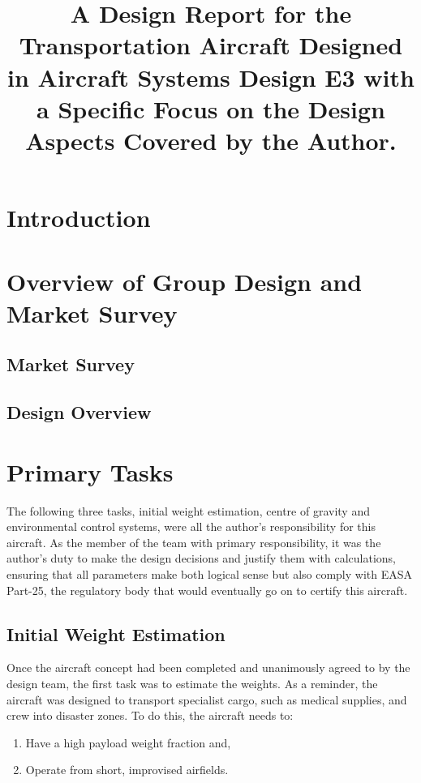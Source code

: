 \documentclass[stu, a4paper, 12pt, floatsintext]{apa7}
\title{A Design Report for the Transportation Aircraft Designed in Aircraft Systems Design E3 with a Specific Focus on the Design Aspects Covered by the Author.}
\numberwithin{figure}{section}
\numberwithin{table}{section}
\numberwithin{equation}{section}
\begin{document}
\maketitle{} %

\tableofcontents

\newpage

\listoffigures
{}
\listoftables
{}
\listofmyequations

\newpage

\section{Introduction}
\section{Overview of Group Design and Market Survey}
\subsection{Market Survey}
\subsection{Design Overview}
\section{Primary Tasks}
The following three tasks, initial weight estimation, centre of gravity and environmental control systems, were all the author's responsibility for this aircraft. As the member of the team with primary responsibility, it was the author’s duty to make the design decisions and justify them with calculations, ensuring that all parameters make both logical sense but also comply with EASA Part-25, the regulatory body that would eventually go on to certify this aircraft.
\subsection{Initial Weight Estimation}
Once the aircraft concept had been completed and unanimously agreed to by the design team, the first task was to estimate the weights. As a reminder, the aircraft was designed to transport specialist cargo, such as medical supplies, and crew into disaster zones. To do this, the aircraft needs to:
\begin{enumerate}
    \item Have a high payload weight fraction and, 
    \item Operate from short, improvised airfields.
\end{enumerate}
\end{document}
